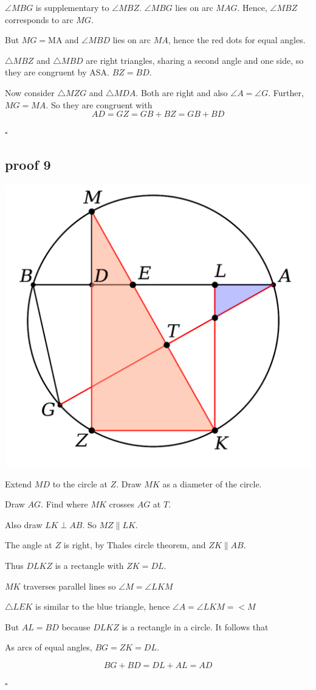 \documentclass[11pt, oneside]{article}
\begin{document}
$\angle MBG$ is supplementary to $\angle MBZ$.  $\angle MBG$ lies on arc $MAG$.  Hence, $\angle MBZ$ corresponds to arc $MG$.

But $MG = $MA and $\angle MBD$ lies on arc $MA$, hence the red dots for equal angles.

$\triangle MBZ$ and $\triangle MBD$ are right triangles, sharing a second angle and one side, so they are congruent by ASA.  $BZ = BD$.

Now consider $\triangle MZG$ and $\triangle MDA$.  Both are right and also $\angle A = \angle G$.  Further, $MG = MA$.  So they are congruent with 
\[ AD = GZ = GB + BZ = GB + BD \]

$\square$

\subsection*{proof 9}

\begin{center} \includegraphics [scale=0.40] {bc9.png} \end{center}

Extend $MD$ to the circle at $Z$.  Draw $MK$ as a diameter of the circle.

Draw $AG$.  Find where $MK$ crosses $AG$ at $T$.  

Also draw $LK \perp AB$.  So $MZ \parallel LK$.

The angle at $Z$ is right, by Thales circle theorem, and $ZK \parallel AB$.  

Thus $DLKZ$ is a rectangle with $ZK = DL$.

$MK$ traverses parallel lines so $\angle M = \angle LKM$

$\triangle LEK$ is similar to the blue triangle, hence $\angle A = \angle LKM = < M$

But $AL = BD$ because $DLKZ$ is a rectangle in a circle.  It follows that

As arcs of equal angles, $BG = ZK = DL$.

\[ BG + BD = DL + AL = AD \]

$\square$
\end{document}

